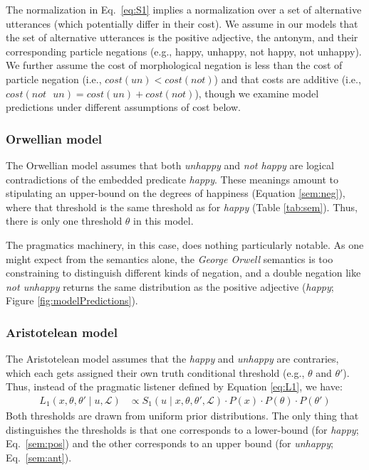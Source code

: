 \documentclass[floatsintext,doc]{apa6}
\begin{document}
The normalization in Eq.~\ref{eq:S1} implies a normalization over a set of alternative utterances (which potentially differ in their cost). 
We assume in our models that the set of alternative utterances is the positive adjective, the antonym, and their corresponding particle negations (e.g., happy, unhappy, not happy, not unhappy). 
We further assume the cost of morphological negation is less than the cost of particle negation (i.e., $cost(un) < cost(not)$) and that costs are additive (i.e., $cost(not\text{ }un) = cost(un) + cost(not)$), though we examine model predictions under different assumptions of cost below. 

\subsubsection{Orwellian model}

The Orwellian model assumes that both \emph{unhappy} and \emph{not happy} are logical contradictions of the embedded predicate \emph{happy}.
These meanings amount to stipulating an upper-bound on the degrees of happiness (Equation \ref{sem:neg}), where that threshold is the same threshold as for \emph{happy} (Table \ref{tab:sem}).
Thus, there is only one threshold $\theta$ in this model. 

The pragmatics machinery, in this case, does nothing particularly notable.
As one might expect from the semantics alone, the \emph{George Orwell} semantics is too constraining to distinguish different kinds of negation, and a double negation like \emph{not unhappy} returns the same distribution as the positive adjective (\emph{happy}; Figure \ref{fig:modelPredictions}).

\subsubsection{Aristotelean model}

The Aristotelean model assumes that the \emph{happy} and \emph{unhappy} are contraries, which each gets assigned their own truth conditional threshold (e.g., $\theta$ and $\theta'$). Thus, instead of the pragmatic listener defined by Equation \ref{eq:L1}, we have: 
%
\begin{align}
L_{1}(x, \theta, \theta' \mid u,  \mathcal{L}) &\propto S_{1}(u \mid x, \theta, \theta', \mathcal{L}) \cdot P(x) \cdot  P(\theta)  \cdot  P(\theta') \label{eq:L1aris}
\end{align}
%
Both thresholds are drawn from uniform prior distributions. The only thing that distinguishes the thresholds is that one corresponds to a lower-bound (for \emph{happy}; Eq.~\ref{sem:pos}) and the other corresponds to an upper bound (for \emph{unhappy}; Eq.~\ref{sem:ant}). 
\end{document}

